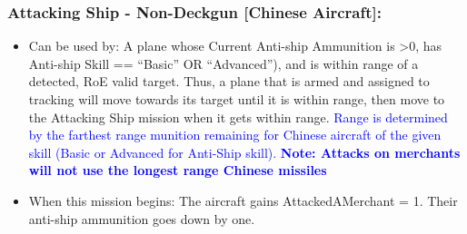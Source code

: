 \documentclass{article}
\begin{document}
    \subsubsection{Attacking Ship - Non-Deckgun [Chinese Aircraft]:} 
           \begin{itemize}
                \item{Can be used by:} A plane whose Current Anti-ship Ammunition is \textgreater 0, has Anti-ship Skill == ``Basic'' OR ``Advanced''), and is within range of a detected, RoE valid target. Thus, a plane that is armed and assigned to tracking will move towards its target until it is within range, then move to the Attacking Ship mission when it gets within range. \textcolor{blue}{Range is determined by the farthest range munition remaining for Chinese aircraft of the given skill (Basic or Advanced for Anti-Ship skill). \textbf{Note: Attacks on merchants will not use the longest range Chinese missiles}}
                
                \item{When this mission begins:} The aircraft gains AttackedAMerchant = 1. Their anti-ship ammunition goes down by one.\\ 
                

\end{itemize}
\end{document}
